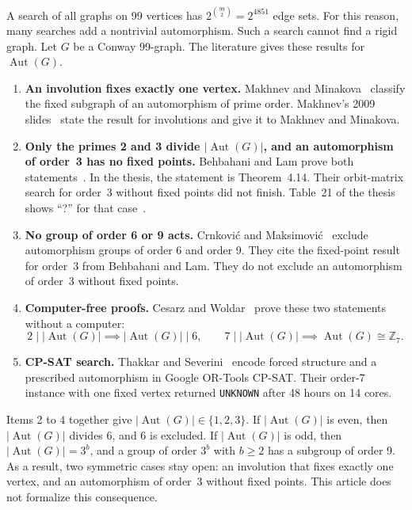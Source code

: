 \documentclass{article}
\theoremstyle{plain}
\theoremstyle{definition}
\DeclareMathOperator{\Aut}{Aut}
\numberwithin{equation}{section}
\begin{document}
A search of all graphs on 99 vertices has $2^{\binom{99}{2}} = 2^{4851}$ edge sets. For this reason, many searches add a nontrivial automorphism. Such a search cannot find a rigid graph. Let $G$ be a Conway 99-graph. The literature gives these results for $\Aut(G)$.
\begin{enumerate}
 \item \textbf{An involution fixes exactly one vertex.} Makhnev and Minakova~\cite{makhnev2001automorphisms} classify the fixed subgraph of an automorphism of prime order. Makhnev's 2009 slides~\cite{makhnev2009symmetric} state the result for involutions and give it to Makhnev and Minakova.
 \item \textbf{Only the primes 2 and 3 divide $|\Aut(G)|$, and an automorphism of order~3 has no fixed points.} Behbahani and Lam prove both statements~\cite{behbahani2009thesis,behbahani2011strongly}. In the thesis, the statement is Theorem~4.14. Their orbit-matrix search for order~3 without fixed points did not finish. Table~21 of the thesis shows ``?'' for that case~\cite{behbahani2009thesis}.
 \item \textbf{No group of order 6 or 9 acts.} Crnkovi{\'c} and Maksimovi{\'c}~\cite{crnkovic2014strongly} exclude automorphism groups of order 6 and order 9. They cite the fixed-point result for order~3 from Behbahani and Lam. They do not exclude an automorphism of order~3 without fixed points.
 \item \textbf{Computer-free proofs.} Cesarz and Woldar~\cite{cesarz2025automorphisms} prove these two statements without a computer:
 \begin{equation}
  2 \mid |\Aut(G)| \implies |\Aut(G)| \mid 6,
  \qquad
  7 \mid |\Aut(G)| \implies \Aut(G) \cong \mathbb{Z}_7.
  \label{eq:prior_bounds}
 \end{equation}
 \item \textbf{CP-SAT search.} Thakkar and Severini~\cite{thakkar2026forced} encode forced structure and a prescribed automorphism in Google OR-Tools CP-SAT. Their order-7 instance with one fixed vertex returned \texttt{UNKNOWN} after 48 hours on 14 cores.
\end{enumerate}
Items 2 to 4 together give $|\Aut(G)| \in \{1, 2, 3\}$.
If $|\Aut(G)|$ is even, then $|\Aut(G)|$ divides 6, and 6 is excluded.
If $|\Aut(G)|$ is odd, then $|\Aut(G)| = 3^b$, and a group of order $3^b$ with $b \ge 2$ has a subgroup of order 9.
As a result, two symmetric cases stay open: an involution that fixes exactly one vertex, and an automorphism of order~3 without fixed points.
This article does not formalize this consequence.
\end{document}

